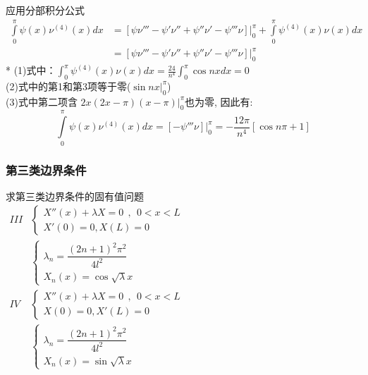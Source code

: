 \begin{frame}
			应用分部积分公式 \\
			$\displaystyle \begin{array}{lllllllll}
				\int\limits_{0}^{\pi}  \psi (x) \nu^{(4)} (x)  dx 
				&= [ \psi \nu''' - \psi' \nu'' + \psi'' \nu' -\psi''' \nu ]|_0 ^\pi +	\int\limits_{0}^{\pi}  \psi^{(4)} (x)  \nu (x)  dx  \\
				&=  [ \psi \nu''' - \psi' \nu'' + \psi'' \nu' -\psi''' \nu ]|_0 ^\pi 
			\end{array}$ \\ 
			* (1)式中：$\int_{0}^{\pi}  \psi^{(4)} (x)  \nu (x)  dx = \frac{24}{n^4} \int_{0}^{\pi}  \cos nx dx =0$ \\
			(2)式中的第1和第3项等于零($\sin nx |_0 ^\pi$) \\
			(3)式中第二项含 $2x(2x - \pi )(x - \pi )|_0 ^\pi$也为零, 因此有:
			\begin{equation*}
				\int\limits_{0}^{\pi}  \psi (x) \nu^{(4)} (x)  dx = [-\psi''' \nu ]|_0 ^\pi =  -\dfrac{12 \pi}{n^4}  [\cos n\pi +1 ]
			\end{equation*}
\end{frame}	

\begin{frame}
	\frametitle{第三类边界条件}
	求第三类边界条件的固有值问题\\
	$\begin{array}{lllllllll}
	III & \begin{cases}
			X'' (x)  + \lambda X =0   ~~,~~ 0<x<L\\
			X' (0) =0, X (L) =0
	\end{cases}\\	
	& \begin{cases}
		\lambda_n=\dfrac{(2n+1)^2 \pi ^2}{4l^2}\\
		X_n(x) = \cos \sqrt{\lambda} x
	\end{cases}\\	
	IV&\begin{cases}
		X'' (x)  + \lambda X =0   ~~,~~ 0<x<L\\
		X (0) =0, X' (L) =0
	\end{cases} \\	
	& \begin{cases}
		\lambda_n=\dfrac{(2n+1)^2 \pi ^2}{4l^2}\\
		X_n(x) = \sin \sqrt{\lambda} x
    \end{cases}\\	
	\end{array}$ \\ 
\end{frame}	

